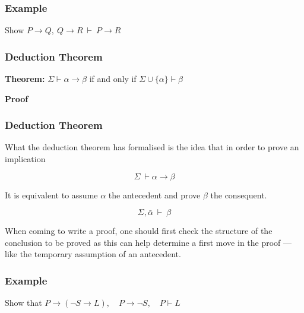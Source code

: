 \documentclass{beamer}
\begin{document}
\begin{frame}
	\frametitle{Example}
	
	Show $P \rightarrow Q, \ Q \rightarrow R \ \vdash \ P \rightarrow R$
	
	\vspace{7cm}
	
\end{frame}

\begin{frame}
	\frametitle{Deduction Theorem}	
	
	{\bf Theorem:} $\Sigma \vdash \alpha \rightarrow \beta$ if and only if $\Sigma \cup \{\alpha\} \vdash \beta$
	
	\vspace{0.5cm}
	
	{\bf Proof} 
	
	\vspace{5cm}
	
	
	
\end{frame}

\begin{frame}
	\frametitle{Deduction Theorem}

	What the deduction theorem has formalised is the idea that in order to prove an implication 

	$$\Sigma \ \vdash \alpha \to \beta$$

	It is equivalent to assume $\alpha$ the antecedent and prove $\beta$ the consequent. 

	$$\Sigma, \bar{\alpha} \ \vdash \ \beta$$

	When coming to write a proof, one should first check the structure of the conclusion to be proved as this can help determine a first move in the proof --- like the temporary assumption of an antecedent. 
\end{frame}

\begin{frame}
	\frametitle{Example}
	
	Show that $P \rightarrow (\lnot S\rightarrow L), \hspace{1em} P\rightarrow \lnot S, \hspace{1em} P \vdash L$

	\vspace{7cm}
	
\end{frame}
\end{document}

